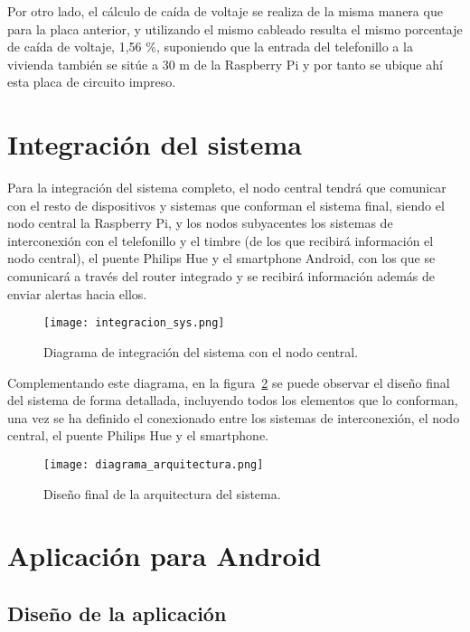         Por otro lado, el cálculo de caída de voltaje se realiza de la misma manera que para la placa anterior, y utilizando el mismo cableado resulta el mismo porcentaje de caída de voltaje, 1,56 \%, suponiendo que la entrada del telefonillo a la vivienda también se sitúe a 30 m de la Raspberry Pi y por tanto se ubique ahí esta placa de circuito impreso.
        
\section{Integración del sistema}

    Para la integración del sistema completo, el nodo central tendrá que comunicar con el resto de dispositivos y sistemas que conforman el sistema final, siendo el nodo central la Raspberry Pi, y los nodos subyacentes los sistemas de interconexión con el telefonillo y el timbre (de los que recibirá información el nodo central), el puente Philips Hue y el smartphone Android, con los que se comunicará a través del router integrado y se recibirá información además de enviar alertas hacia ellos. \\

    \begin{figure}[H]
      \centering
        \texttt{[image: integracion\_sys.png]}
      \caption{Diagrama de integración del sistema con el nodo central.}
      \label{integracion_sys}
    \end{figure}
    
     Complementando este diagrama, en la figura~\ref{diagrama_arquitectura} se puede observar el diseño final del sistema de forma detallada, incluyendo todos los elementos que lo conforman, una vez se ha definido el conexionado entre los sistemas de interconexión, el nodo central, el puente Philips Hue y el smartphone. \\

    \begin{figure}[H]
      \centering
        \texttt{[image: diagrama\_arquitectura.png]}
      \caption{Diseño final de la arquitectura del sistema.}
      \label{diagrama_arquitectura}
    \end{figure}

\section{Aplicación para Android}

    \subsection{Diseño de la aplicación}

